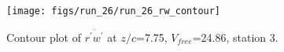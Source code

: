 \begin{figure}[H]
\centering
\texttt{[image: figs/run\_26/run\_26\_rw\_contour]}
\caption{Contour plot of $\overline{r^\prime w^\prime}$ at $z/c$=7.75, $V_{free}$=24.86, station 3.}
\label{fig:run_26_rw_contour}
\end{figure}


